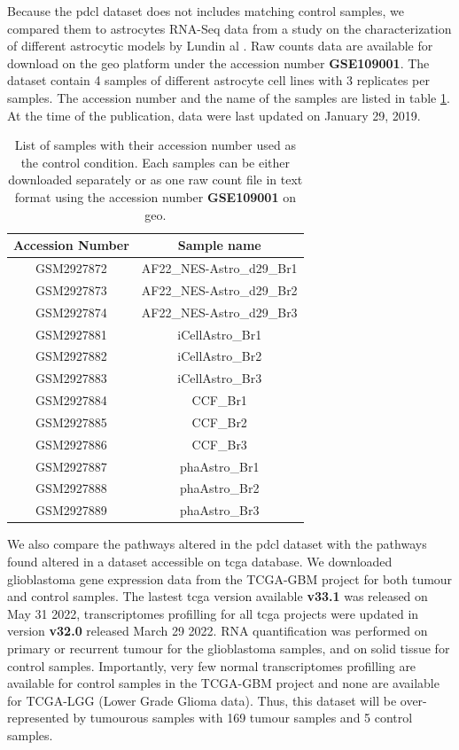 Because the \acrshort{pdcl} dataset does not includes matching control samples, we compared them to astrocytes RNA-Seq data from a study on the characterization of different astrocytic models by Lundin  al \cite*{Lundin2018}.
Raw counts data are available for download on the \acrfull{geo} platform under the accession number \textbf{GSE109001}.
The dataset contain 4 samples of different astrocyte cell lines with 3 replicates per samples.
The accession number and the name of the samples are listed in table \ref*{table:list-control-samples}.
At the time of the publication, data were last updated on January 29, 2019.

\begin{table}
    \centering
    \begin{tabular}{ |c|c| }
        \hline
        Accession Number & Sample name \\
        \hline
        GSM2927872 & AF22\_NES-Astro\_d29\_Br1 \\
        GSM2927873 & AF22\_NES-Astro\_d29\_Br2 \\
        GSM2927874 & AF22\_NES-Astro\_d29\_Br3 \\
        \hline
        GSM2927881 & iCellAstro\_Br1 \\
        GSM2927882 & iCellAstro\_Br2 \\
        GSM2927883 & iCellAstro\_Br3 \\
        \hline
        GSM2927884 & CCF\_Br1 \\
        GSM2927885 & CCF\_Br2 \\
        GSM2927886 & CCF\_Br3 \\
        \hline
        GSM2927887 & phaAstro\_Br1 \\ 
        GSM2927888 & phaAstro\_Br2 \\ 
        GSM2927889 & phaAstro\_Br3 \\ 
        \hline
    \end{tabular}
    \caption{
        List of samples with their accession number used as the control condition.
        Each samples can be either downloaded separately or as one raw count file in text format using the accession number \textbf{GSE109001} on \acrshort{geo}.
    }
    \label{table:list-control-samples}
\end{table}

We also compare the pathways altered in the \acrshort{pdcl} dataset with the pathways found altered in a dataset accessible on \acrshort{tcga} database. 
We downloaded glioblastoma gene expression data from the TCGA-GBM project for both tumour and control samples.
The lastest \acrshort{tcga} version available \textbf{v33.1} was released on May 31 2022, transcriptomes profilling for all \acrshort{tcga} projects were updated in version \textbf{v32.0} released March 29 2022.
RNA quantification was performed on primary or recurrent tumour for the glioblastoma samples, and on solid tissue for control samples.
Importantly, very few normal transcriptomes profilling are available for control samples in the TCGA-GBM project and none are available for TCGA-LGG (Lower Grade Glioma data).
Thus, this dataset will be over-represented by tumourous samples with 169 tumour samples and 5 control samples.

